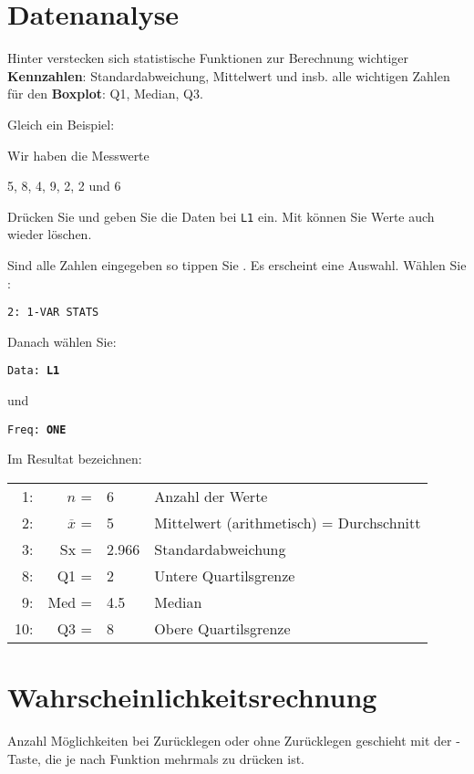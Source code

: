 \section{Datenanalyse}\label{daan}
Hinter  verstecken sich statistische
Funktionen zur Berechnung wichtiger \textbf{Kennzahlen}:
Standardabweichung, Mittelwert und insb. alle wichtigen Zahlen für
den \textbf{Boxplot}: Q1, Median, Q3.

Gleich ein Beispiel:

Wir haben die Messwerte

5, 8, 4, 9, 2, 2 und 6

Drücken Sie  und geben Sie die Daten
bei \texttt{L1} ein.
Mit  können Sie Werte auch wieder löschen.

Sind alle Zahlen eingegeben so tippen
Sie . Es erscheint eine
Auswahl. Wählen Sie :

\texttt{2: 1-VAR STATS}

Danach wählen Sie:

\texttt{Data: \textbf{L1}}

und

\texttt{Freq: \textbf{ONE}}

Im Resultat bezeichnen:

\begin{tabular}{r|r l|p{9cm}}
 1: & $n$            = & 6     & Anzahl der Werte\\
 2: & $\overline{x}$ = & 5     & Mittelwert (arithmetisch) = Durchschnitt\\
 3: & Sx             = & 2.966 & Standardabweichung \\
 8: & Q1             = & 2     & Untere Quartilsgrenze \\
 9: & Med            = & 4.5   & Median \\
10: & Q3             = & 8     & Obere Quartilsgrenze \\


\end{tabular}


\section{Wahrscheinlichkeitsrechnung}\label{wahrscheinlichkeitsrechnung}
Anzahl Möglichkeiten bei Zurücklegen oder ohne Zurücklegen geschieht mit der -Taste, die je nach Funktion mehrmals zu drücken ist. 

